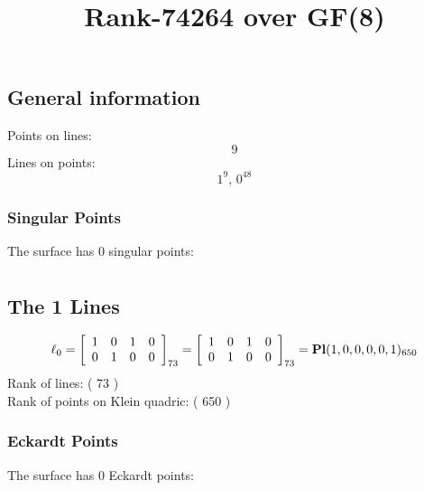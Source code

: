 \documentclass{article}
\newcommand\setTBstruts{\def\T{\rule{0pt}{2.6ex}}%
\def\B{\rule[-1.2ex]{0pt}{0pt}}}
\begin{document}
 
\setTBstruts



{\allowdisplaybreaks%






\title{Rank-74264 over GF(8)}
\author{}%
\maketitle%
%
{}



\subsection*{General information}
Points on lines:
$$
9$$
Lines on points:
$$
1^9,\,0^{48}$$
\subsubsection*{Singular Points}
The surface has 0 singular points:\\
\begin{align*}
\end{align*}
\subsection*{The 1 Lines}
$$
\ell_{0} = 
\left[
\begin{array}{*{4}{r}}
1 & 0 & 1 & 0\\
0 & 1 & 0 & 0\\
\end{array}
\right]
_{73}
=
\left[
\begin{array}{*{4}c}
1  & 0  & 1  & 0\\
0  & 1  & 0  & 0\\
\end{array}
\right]_{73}
={\rm\bf Pl}(1,0,0,0,0,1 )_{650}$$
Rank of lines: ( 73 )\\
Rank of points on Klein quadric: ( 650 )\\
\subsubsection*{Eckardt Points}
The surface has 0 Eckardt points:\\
}
\end{document}
